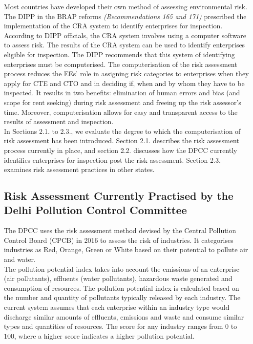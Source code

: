\documentclass[a4paper, 12pt]{article}
\begin{document}
                 Most countries have developed their own method of assessing environmental risk. The DIPP in the BRAP reforms \textit{(Recommendations 165 and 171)} prescribed the implementation of the CRA system to identify enterprises for inspection. \\ 
                 
                 According to DIPP officials, the CRA system involves using a computer software to assess risk. The results of the CRA system can be used to identify enterprises eligible for inspection. The DIPP recommends that this system of identifying enterprises must be computerised. The computerisation of the risk assessment process reduces the EEs’ role in assigning risk categories to enterprises when they apply for CTE and CTO and in deciding if, when and by whom they have to be inspected. It results in two benefits: elimination of human errors and bias (and scope for rent seeking) during  risk assessment and freeing up the risk assessor’s time. Moreover, computerisation allows for easy and transparent access to the results of assessment and inspection. \\
                 
                 In Sections 2.1. to 2.3., we evaluate the degree to which the computerisation of risk assessment has been introduced. Section 2.1. describes the risk assessment process currently in place, and section 2.2. discusses how the DPCC currently identifies enterprises for inspection post the risk assessment. Section 2.3. examines risk assessment practices in other states. %
                 
                 \subsection{Risk Assessment Currently Practised by the Delhi Pollution Control Committee}
                 
                 The DPCC uses the risk assessment method devised by the Central Pollution Control Board (CPCB) in 2016 to assess the risk of industries. It categorises industries as Red, Orange, Green or White based on their potential to pollute air and water. \\
                 
                 The pollution potential index takes into account the emissions of an enterprise (air pollutants), effluents (water pollutants), hazardous waste generated and consumption of resources. The pollution potential index is calculated based on the number and quantity of pollutants typically released by each industry. The current system assumes that each enterprise within an industry type would discharge similar amounts of effluents, emissions and waste and consume similar types and quantities of resources. The score for any industry ranges from 0 to 100, where a higher score indicates a higher pollution potential. \\
                 
\end{document}
